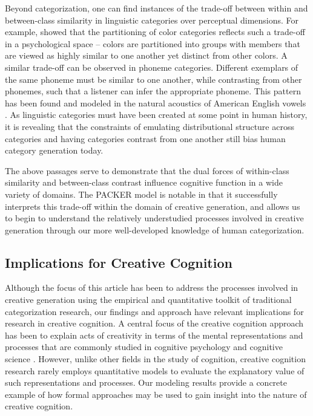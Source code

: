 \documentclass[12pt]{article}
\begin{document}
\begin{flushleft}

Beyond categorization, one can find instances of the trade-off between within and between-class similarity in linguistic categories over perceptual dimensions. For example, \cite{regier2007} showed that the partitioning of color categories reflects such a trade-off in a psychological space -- colors are partitioned into groups with members that are viewed as highly similar to one another yet distinct from other colors. A similar trade-off can be observed in phoneme categories. Different exemplars of the same phoneme must be similar to one another, while contrasting from other phonemes, such that a listener can infer the appropriate phoneme. This pattern has been found and modeled in the natural acoustics of American English vowels \citep{feldman2013,hillenbrand1995}. As linguistic categories must have been created at some point in human history, it is revealing that the constraints of emulating distributional structure across categories and having categories contrast from one another still bias human category generation today.

The above passages serve to demonstrate that the dual forces of within-class similarity and between-class contrast influence cognitive function in a wide variety of domains. The PACKER model is notable in that it successfully interprets this trade-off within the domain of creative generation, and allows us to begin to understand the relatively understudied processes involved in creative generation through our more well-developed knowledge of human categorization.


\subsection{Implications for Creative Cognition}

Although the focus of this article has been to address the processes involved in creative generation using the empirical and quantitative toolkit of traditional categorization research, our findings and approach have relevant implications for research in creative cognition. A central focus of the creative cognition approach has been to explain acts of creativity in terms of the mental representations and processes that are commonly studied in cognitive psychology and cognitive science \citep{finke1992creative,smith1995creative}. However, unlike other fields in the study of cognition, creative cognition research rarely employs quantitative models to evaluate the explanatory value of such representations and processes. Our modeling results provide a concrete example of how formal approaches may be used to gain insight into the nature of creative cognition.


\end{flushleft}
\end{document}
